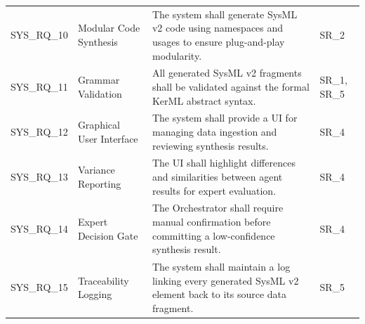 \documentclass{article}
\begin{document}
\begin{table}[ht]
\begin{tabularx}{\textwidth}{@{} l X X l @{}}
SYS\_RQ\_10 & Modular Code Synthesis &
The system shall generate SysML v2 code using namespaces and usages to ensure plug-and-play modularity. &
SR\_2 \\

SYS\_RQ\_11 & Grammar Validation &
All generated SysML v2 fragments shall be validated against the formal KerML abstract syntax. &
SR\_1, SR\_5 \\

SYS\_RQ\_12 & Graphical User Interface &
The system shall provide a UI for managing data ingestion and reviewing synthesis results. &
SR\_4 \\

SYS\_RQ\_13 & Variance Reporting &
The UI shall highlight differences and similarities between agent results for expert evaluation. &
SR\_4 \\

SYS\_RQ\_14 & Expert Decision Gate &
The Orchestrator shall require manual confirmation before committing a low-confidence synthesis result. &
SR\_4 \\

SYS\_RQ\_15 & Traceability Logging &
The system shall maintain a log linking every generated SysML v2 element back to its source data fragment. &
SR\_5 \\

\bottomrule
\end{tabularx}
\end{table}
\end{document}
